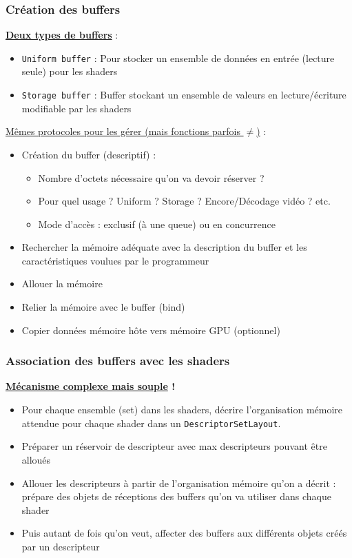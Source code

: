 \documentclass{beamer}
\begin{document}
\begin{frame}[fragile]
\frametitle{Création des buffers}

\textcolor{BurntOrange}{\textbf{\underline{Deux types de buffers}} :}
\begin{itemize}
\item \textcolor{NavyBlue}{\texttt{Uniform buffer}} : Pour stocker un ensemble de données
en entrée (lecture seule) pour les shaders
\item \textcolor{NavyBlue}{\texttt{Storage buffer}} : Buffer stockant un ensemble de valeurs en lecture/écriture
modifiable par les shaders
\end{itemize}
\textcolor{BurntOrange}{\underline{Mêmes protocoles pour les gérer (mais fonctions parfois $\neq$)}} :
\begin{itemize}
\item Création du buffer (descriptif) : 
\begin{itemize}
    \scriptsize
\item Nombre d'octets nécessaire qu'on va devoir réserver ?
\item Pour quel usage ? Uniform ? Storage ? Encore/Décodage vidéo ? etc.
\item Mode d'accès : exclusif (à une queue) ou en concurrence
\end{itemize}
\item Rechercher la mémoire adéquate avec la description du buffer et les caractéristiques voulues par le programmeur
\item Allouer la mémoire
\item Relier la mémoire avec le buffer (bind)
\item Copier données mémoire hôte vers mémoire GPU (optionnel)
\end{itemize}
\end{frame}

\begin{frame}[fragile]
\frametitle{Association des buffers avec les shaders}

\textcolor{BrickRed}{\textbf{\underline{Mécanisme complexe mais souple} !}}
\begin{itemize}
    \small
\item Pour chaque ensemble (set) dans les shaders, décrire
l'organisation mémoire attendue pour chaque shader dans un \texttt{DescriptorSetLayout}.
\item Préparer un réservoir de descripteur avec max descripteurs pouvant être alloués
\item Allouer les descripteurs à partir de l'organisation mémoire qu'on a décrit : prépare
des objets de réceptions des buffers qu'on va utiliser dans chaque shader
\item Puis autant de fois qu'on veut, affecter des buffers aux différents objets créés par un descripteur
\end{itemize}
\end{frame}
\end{document}
